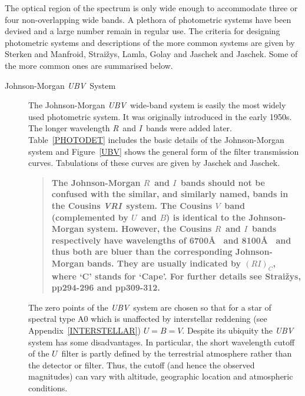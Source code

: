 \documentclass[twoside,11pt]{article}
\begin{document}
The optical region of the spectrum is only wide enough to accommodate
three or four non-overlapping wide bands.  A plethora of photometric
systems have been devised and a large number remain in regular use.
The criteria for designing photometric systems and descriptions of the
more common systems are given by Sterken and Manfroid\cite{STERKEN92},
Strai\v{z}ys\cite{STRAIZYS92}, Lamla\cite{LAMLA82}, Golay\cite{GOLAY74}
and Jaschek and Jaschek\cite{JASCHEK87}.  Some of the more common ones
are summarised below.

\begin{description}

  \item[Johnson-Morgan {\it UBV}\, System] The Johnson-Morgan {\it UBV}\,
   wide-band system\cite{JOHNSON51, JOHNSON53} is easily the most widely
   used photometric system.  It was originally introduced in the early
   1950s.  The longer wavelength {\it R}\, and {\it I}\, bands were added
   later\cite{JOHNSON65}.  Table~\ref{PHOTODET} includes the basic details
   of the Johnson-Morgan system and Figure~\ref{UBV} shows the general
   form of the filter transmission curves.  Tabulations of these curves
   are given by Jaschek and Jaschek\cite{JASCHEK87}.

  \begin{quote}
   {\bf The Johnson-Morgan $R$\, and $I$\, bands should not be confused
   with the similar, and similarly named, bands in the Cousins {\it VRI}\,
   system\cite{COUSINS76, COUSINS78}.  The Cousins $V$\, band
   (complemented by $U$\, and $B$) is identical to the Johnson-Morgan
   system.  However, the Cousins $R$\, and $I$\, bands respectively have
   wavelengths of 6700\AA~ and 8100\AA~ and thus both are bluer than the
   corresponding Johnson-Morgan bands.  They are usually indicated by
   $(RI)_{C}$, where `C' stands for `Cape'.  For further details see
   Strai\v{z}ys\cite{STRAIZYS92}, pp294-296 and pp309-312.}
  \end{quote}

   The zero points of the {\it UBV}\, system are chosen so that for a star
   of spectral type A0 which is unaffected by interstellar reddening (see
   Appendix~\ref{INTERSTELLAR}) $U = B = V$.  Despite its ubiquity the
   {\it UBV}\, system has some disadvantages.  In particular, the short
   wavelength  cutoff of the $U$\, filter is partly defined by the
   terrestrial atmosphere rather than the detector or filter.  Thus, the
   cutoff (and hence the observed magnitudes) can vary with altitude,
   geographic location and atmospheric conditions.


\end{description}
\end{document}
